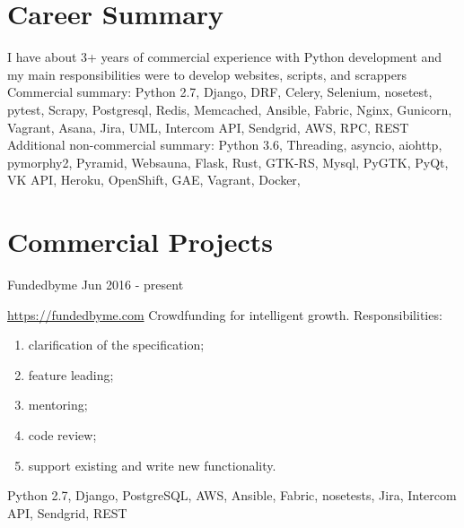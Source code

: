 \documentclass[11pt,a4paper]{moderncv}
\begin{document}
	\maketitle
	
	\section{Career Summary}
	\cvline
	{}
	{I have about 3+ years of commercial experience with Python development and my main responsibilities were to develop websites, scripts, and scrappers\newline{}\newline{}
	Commercial summary: Python 2.7, Django, DRF, Celery, Selenium, nosetest, pytest, Scrapy, Postgresql, Redis, Memcached, Ansible, Fabric, Nginx, Gunicorn, Vagrant, Asana, Jira, UML, Intercom API, Sendgrid, AWS, RPC, REST\newline{}\newline{}
	Additional non-commercial summary: Python 3.6, Threading, asyncio, aiohttp, pymorphy2, Pyramid, Websauna, Flask, Rust, GTK-RS, Mysql, PyGTK, PyQt, VK API, Heroku, OpenShift, GAE, Vagrant, Docker, }
	

	\section{Commercial Projects}
	\cvline
	{Fundedbyme Jun 2016 - present}
	{\url{https://fundedbyme.com}\newline{}
		Crowdfunding for intelligent growth.\newline{}
        Responsibilities:
            \begin{enumerate}
                \item clarification of the specification;
                \item feature leading;
                \item mentoring;
                \item code review;
                \item support existing and write new functionality.
            \end{enumerate}
		\newline{}\newline{}
		Python 2.7, Django, PostgreSQL, AWS, Ansible, Fabric, nosetests, Jira, Intercom API, Sendgrid, REST}
\end{document}
